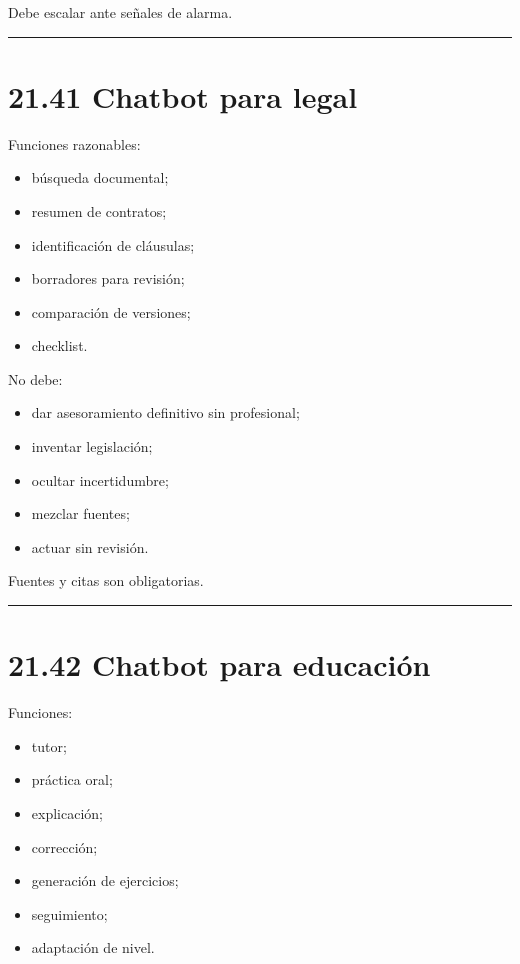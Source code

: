 Debe escalar ante señales de alarma.

\begin{center}\rule{0.5\linewidth}{0.5pt}\end{center}

\section{21.41 Chatbot para legal}\label{chatbot-para-legal}

Funciones razonables:

\begin{itemize}
\tightlist
\item
  búsqueda documental;
\item
  resumen de contratos;
\item
  identificación de cláusulas;
\item
  borradores para revisión;
\item
  comparación de versiones;
\item
  checklist.
\end{itemize}

No debe:

\begin{itemize}
\tightlist
\item
  dar asesoramiento definitivo sin profesional;
\item
  inventar legislación;
\item
  ocultar incertidumbre;
\item
  mezclar fuentes;
\item
  actuar sin revisión.
\end{itemize}

Fuentes y citas son obligatorias.

\begin{center}\rule{0.5\linewidth}{0.5pt}\end{center}

\section{21.42 Chatbot para educación}\label{chatbot-para-educaciuxf3n}

Funciones:

\begin{itemize}
\tightlist
\item
  tutor;
\item
  práctica oral;
\item
  explicación;
\item
  corrección;
\item
  generación de ejercicios;
\item
  seguimiento;
\item
  adaptación de nivel.
\end{itemize}

